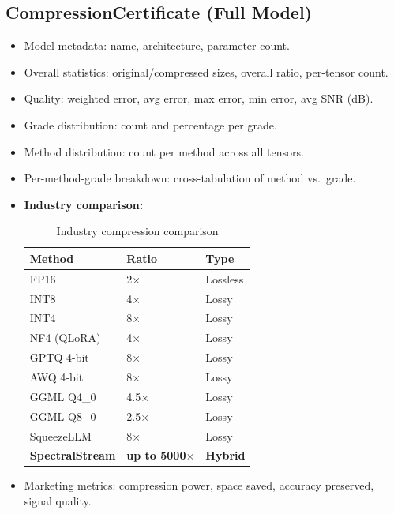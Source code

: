 \documentclass[11pt,a4paper,openright]{book}
\begin{document}
\subsection{CompressionCertificate (Full Model)}

\begin{itemize}
	\item Model metadata: name, architecture, parameter count.
	\item Overall statistics: original/compressed sizes, overall ratio, per-tensor count.
	\item Quality: weighted error, avg error, max error, min error, avg SNR (dB).
	\item Grade distribution: count and percentage per grade.
	\item Method distribution: count per method across all tensors.
	\item Per-method-grade breakdown: cross-tabulation of method vs.\ grade.
	\item \textbf{Industry comparison:}

	      \begin{table}[ht]
		      \centering
		      \caption{Industry compression comparison}
		      \begin{tabular}{lll}
			      \toprule
			      Method                  & Ratio                       & Type            \\
			      \midrule
			      FP16                    & 2$\times$                   & Lossless        \\
			      INT8                    & 4$\times$                   & Lossy           \\
			      INT4                    & 8$\times$                   & Lossy           \\
			      NF4 (QLoRA)             & 4$\times$                   & Lossy           \\
			      GPTQ 4-bit              & 8$\times$                   & Lossy           \\
			      AWQ 4-bit               & 8$\times$                   & Lossy           \\
			      GGML Q4\_0              & 4.5$\times$                 & Lossy           \\
			      GGML Q8\_0              & 2.5$\times$                 & Lossy           \\
			      SqueezeLLM              & 8$\times$                   & Lossy           \\
			      \textbf{SpectralStream} & \textbf{up to 5000$\times$} & \textbf{Hybrid} \\
			      \bottomrule
		      \end{tabular}
	      \end{table}

	\item Marketing metrics: compression power, space saved, accuracy preserved, signal quality.
\end{itemize}
\end{document}
